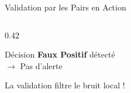 \documentclass[aspectratio=169]{beamer}
\begin{document}
\begin{frame}[fragile]{Validation par les Pairs en Action}
\begin{columns}[c]
\begin{column}{0.42\textwidth}
            \vspace{0.3cm}
            
            \begin{alertblock}{Décision}
                \textbf{Faux Positif} détecté \\
                $\rightarrow$ Pas d'alerte
            \end{alertblock}
            
            \vspace{0.2cm}
            
            {\small La validation filtre le bruit local !}
        \end{column}
    \end{columns}
\end{frame}

    
    
\end{document}
